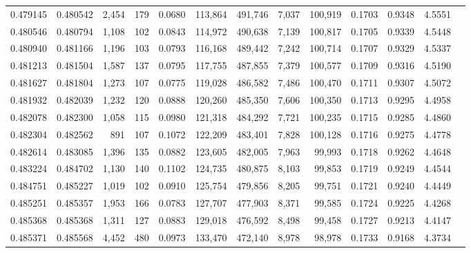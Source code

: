 \begin{tabular}{rrrrrrrrrrrrr}
0.479145 & 0.480542 & 2,454 &   179 &                                     0.0680 & 113,864 & 491,746 &   7,037 & 100,919 & 0.1703 & 0.9348 & 4.5551 \\
0.480546 & 0.480794 & 1,108 &   102 &                                     0.0843 & 114,972 & 490,638 &   7,139 & 100,817 & 0.1705 & 0.9339 & 4.5448 \\
0.480940 & 0.481166 & 1,196 &   103 &                                     0.0793 & 116,168 & 489,442 &   7,242 & 100,714 & 0.1707 & 0.9329 & 4.5337 \\
0.481213 & 0.481504 & 1,587 &   137 &                                     0.0795 & 117,755 & 487,855 &   7,379 & 100,577 & 0.1709 & 0.9316 & 4.5190 \\
0.481627 & 0.481804 & 1,273 &   107 &                                     0.0775 & 119,028 & 486,582 &   7,486 & 100,470 & 0.1711 & 0.9307 & 4.5072 \\
0.481932 & 0.482039 & 1,232 &   120 &                                     0.0888 & 120,260 & 485,350 &   7,606 & 100,350 & 0.1713 & 0.9295 & 4.4958 \\
0.482078 & 0.482300 & 1,058 &   115 &                                     0.0980 & 121,318 & 484,292 &   7,721 & 100,235 & 0.1715 & 0.9285 & 4.4860 \\
0.482304 & 0.482562 &   891 &   107 &                                     0.1072 & 122,209 & 483,401 &   7,828 & 100,128 & 0.1716 & 0.9275 & 4.4778 \\
0.482614 & 0.483085 & 1,396 &   135 &                                     0.0882 & 123,605 & 482,005 &   7,963 &  99,993 & 0.1718 & 0.9262 & 4.4648 \\
0.483224 & 0.484702 & 1,130 &   140 &                                     0.1102 & 124,735 & 480,875 &   8,103 &  99,853 & 0.1719 & 0.9249 & 4.4544 \\
0.484751 & 0.485227 & 1,019 &   102 &                                     0.0910 & 125,754 & 479,856 &   8,205 &  99,751 & 0.1721 & 0.9240 & 4.4449 \\
0.485251 & 0.485357 & 1,953 &   166 &                                     0.0783 & 127,707 & 477,903 &   8,371 &  99,585 & 0.1724 & 0.9225 & 4.4268 \\
0.485368 & 0.485368 & 1,311 &   127 &                                     0.0883 & 129,018 & 476,592 &   8,498 &  99,458 & 0.1727 & 0.9213 & 4.4147 \\
0.485371 & 0.485568 & 4,452 &   480 &                                     0.0973 & 133,470 & 472,140 &   8,978 &  98,978 & 0.1733 & 0.9168 & 4.3734 \\

\end{tabular}
